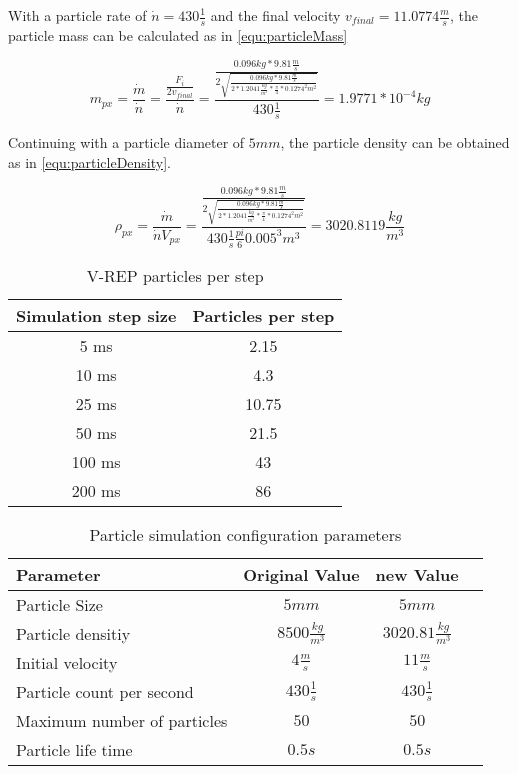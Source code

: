     With a particle rate of $\dot n = 430 \frac{1}{s}$ and the final velocity $v_{final} = 11.0774 \frac{m}{s}$, the particle mass can be calculated as in \ref{equ:particleMass}
  
   \begin{equation}
    m_{px}= \frac{\dot m}{\dot n}=\frac{\frac{F_i}{2 v_{final} }}{\dot n} = \frac{\frac{0.096 kg * 9.81 \frac{m}{s}}{2 \sqrt{\frac{ 0.096 kg * 9.81 \frac{m}{s}}{2 * 1.2041 \frac{kg}{m^3} * \frac{\pi}{4} * 0.1274^2 m^2}} }}{430 \frac{1}{s}} = 1.9771 * 10^{-4} kg
    \label{equ:particleMass}
 \end{equation}
    
    Continuing with a particle diameter of $5mm$, the particle density can be obtained as in \ref{equ:particleDensity}.
  
      
   \begin{equation}
    \rho_{px}= \frac{\dot m}{\dot n V_{px}} = \frac{\frac{0.096 kg * 9.81 \frac{m}{s}}{2 \sqrt{\frac{ 0.096 kg * 9.81 \frac{m}{s}}{2 * 1.2041 \frac{kg}{m^3} * \frac{\pi}{4} * 0.1274^2 m^2}} }}{430 \frac{1}{s} \frac{pi}{6} 0.005^3 m^3} = 3020.8119 \frac{kg}{m^3}
    \label{equ:particleDensity}
 \end{equation}
    
\begin{table}[h]
	\centering
	\begin{tabular}{|c|c|}
    		\hline
		Simulation step size & Particles per step \\
		\hline
    		5 ms & 2.15\\
    		\hline
    		10 ms & 4.3  \\
    		\hline
    		25 ms  & 10.75\\
    		\hline
    		50 ms & 21.5 \\
    		\hline
		100 ms & 43 \\
    		\hline
		200 ms & 86 \\
    		\hline
	\end{tabular}
    	\caption{V-REP particles per step}
      	\label{tab:particleNum}
\end{table}


\begin{table}[h]
	\centering
	\begin{tabular}{|l|c|c|c|}
    		\hline
		Parameter & Original Value & new Value \\
		\hline
    		Particle Size & $5 mm$ &  $5 mm$\\
    		\hline
		Particle densitiy & $ 8500 \frac{kg}{m^3} $ & $3020.81 \frac{kg}{m^3} $   \\
    		\hline
		Initial velocity & $ 4 \frac{m}{s}$ & $11 \frac{m}{s}$  \\
    		\hline
		Particle count per second & $430 \frac{1}{s}$ & $430 \frac{1}{s}$ \\
    		\hline
		Maximum number of particles & $50$ & $50$ \\
    		\hline
		Particle life time & $0.5 s$ & $0.5s$ \\
    		\hline
	\end{tabular}
    	\caption{Particle simulation configuration parameters}
      	\label{tab:particleConf}
\end{table}

